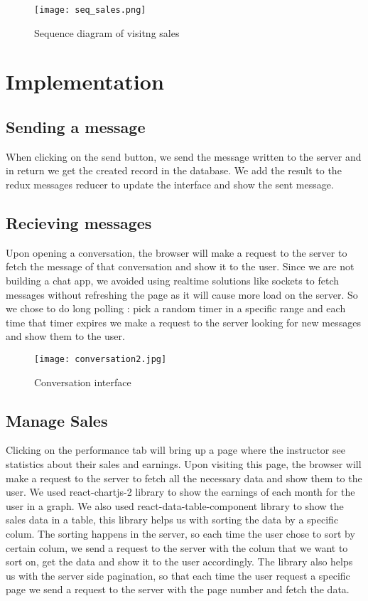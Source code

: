 \begin{figure}[!ht]
    \centering
    \texttt{[image: seq\_sales.png]}
    \caption{Sequence diagram of visitng sales}
    \label{fig:seq_sales}
\end{figure}


\section{Implementation}


\subsection{Sending a message}
When clicking on the send button, we send the message written to the server and in return we get the created record in the database. We add the result to the redux messages reducer to update the interface and show the sent message.

\subsection{Recieving messages}
Upon opening a conversation, the browser will make a request to the server to fetch the message of that conversation and show it to the user.
\hfill \break
Since we are not building a chat app, we avoided using realtime solutions like sockets to fetch messages without refreshing the page as it will cause more load on the server. So we chose to do long polling :  pick a random timer in a specific range and each time that timer expires we make a request to the server looking for new messages and show them to the user. 

\begin{figure}[!ht]
    \centering
    \texttt{[image: conversation2.jpg]}
    \caption{Conversation interface}
    \label{fig:conversation2}
\end{figure}

\subsection{Manage Sales}
Clicking on the performance tab will bring up a page where the instructor see statistics about their sales and earnings. Upon visiting this page, the browser will make a request to the server to fetch all the necessary data and show them to the user.
\hfill \break
\hfill \break
We used react-chartjs-2 library to show the earnings of each month for the user in a graph. 
\hfill \break
\hfill \break
We also used react-data-table-component library to show the sales data in a table, this library helps us with sorting the data by a specific colum. The sorting happens in the server, so each time the user chose to sort by certain colum, we send a request to the server with the colum that we want to sort on, get the data and show it to the user accordingly. The library also helps us with the server side pagination, so that each time the user request a specific page we send a request to the server with the page number and fetch the data. 


